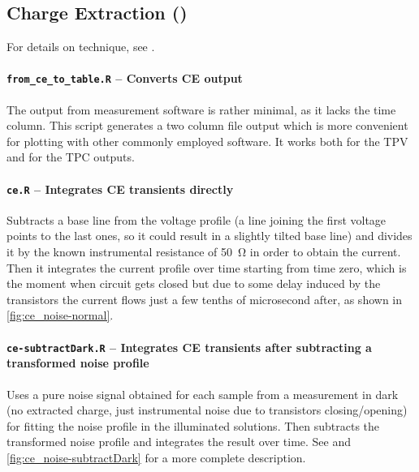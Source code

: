 

	\subsection{Charge Extraction ()}\label{r_ce}
	For details on  technique, see .

		\paragraph{\texttt{from\_ce\_to\_table.R} -- Converts CE output}
		The output from  measurement software is rather minimal, as it lacks the time column.
		This script generates a two column file output which is more convenient for plotting with other commonly employed software.
		It works both for the TPV and for the TPC outputs.
		
		\paragraph{\texttt{ce.R} -- Integrates CE transients directly}
		Subtracts a base line from the voltage profile (a line joining the first voltage points to the last ones, so it could result in a slightly tilted base line) and divides it by the known instrumental resistance of \SI{50}{\ohm} in order to obtain the current.
		Then it integrates the current profile over time starting from time zero, which is the moment when circuit gets closed but due to some delay induced by the transistors the current flows just a few tenths of microsecond after, as shown in \cref{fig:ce_noise-normal}.

		\paragraph{\texttt{ce-\-subtractDark.R} -- Integrates CE transients after subtracting a transformed noise profile}
		Uses a pure noise signal obtained for each sample from a measurement in dark (no extracted charge, just instrumental noise due to transistors closing/opening) for fitting the noise profile in the illuminated solutions.
		Then subtracts the transformed noise profile and integrates the result over time.
		See  and \cref{fig:ce_noise-subtractDark} for a more complete description.
		
